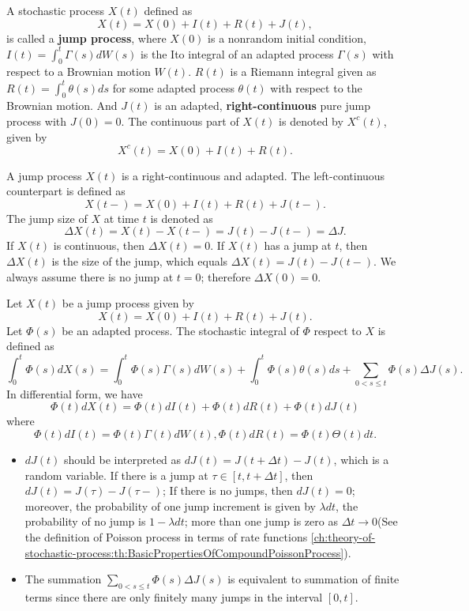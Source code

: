 \begin{refsection}
\begin{definition}\cite[475]{shreve2004stochastic2}
	A stochastic process $X(t)$ defined as
	$$X(t) = X(0) + I(t) + R(t) + J(t),$$
	is called a \textbf{jump process},
	where $X(0)$ is a nonrandom initial condition, $I(t) = \int_0^t \Gamma(s)dW(s)$ is the Ito integral of an adapted process $\Gamma(s)$ with respect to a Brownian motion $W(t)$. $R(t)$ is a Riemann integral given as
	$R(t) = \int_0^t \theta(s)ds$ for some adapted process $\theta(t)$ with respect to the Brownian motion.
	And $J(t)$  is an adapted, \textbf{right-continuous} pure jump process with $J(0) = 0$.
	The continuous part of $X(t)$ is denoted by $X^c(t)$, given by
	$$X^c(t) = X(0) + I(t) + R(t).$$
\end{definition}


\begin{remark}
	A jump process $X(t)$ is a right-continuous and adapted. The left-continuous counterpart is defined as
	$$X(t-) = X(0) + I(t)  + R(t) + J(t-).$$
	The jump size of $X$ at time $t$ is denoted as
	$$\Delta X(t) = X(t) - X(t-) = J(t) - J(t-) = \Delta J.$$
	If $X(t)$ is continuous, then $\Delta X(t) = 0$. If $X(t)$ has a jump at $t$, then $\Delta X(t)$ is the size of the jump, which equals $\Delta X(t)= J(t) - J(t-)$. 
	We always assume there is no jump at $t = 0$; therefore $\Delta X(0) = 0.$
\end{remark}

\begin{definition}\cite[475]{shreve2004stochastic2}
	Let $X(t)$ be a jump process given by
	$$X(t) = X(0) + I(t) + R(t) + J(t).$$
	Let $\Phi(s)$ be an adapted process. The stochastic integral of $\Phi$ respect to $X$ is defined as
	$$\int_0^t \Phi(s)dX(s) = \int_0^t \Phi(s)\Gamma(s)dW(s) + \int_0^t \Phi(s)\theta(s)ds + \sum_{0< s\leq t} \Phi(s)\Delta J(s).$$
	In differential form, we have
	$$\Phi(t)dX(t) = \Phi(t)dI(t) + \Phi(t)dR(t) + \Phi(t) dJ(t)$$
	where
	$$\Phi(t)dI(t) = \Phi(t)\Gamma(t)dW(t), \Phi(t)dR(t) = \Phi(t)\Theta(t)dt.$$
\end{definition}


\begin{remark}[interpretation]\hfill
	\begin{itemize}
		\item $dJ(t)$ should be interpreted as $dJ(t) = J(t+\Delta t) - J(t)$, which is a random variable. If there is a jump at $\tau\in [t,t+\Delta t]$, then $dJ(t) = J(\tau) - J(\tau-)$; If there is no jumps, then $dJ(t) = 0$; moreover, the probability of one jump increment is given by $\lambda d t$, the probability of no jump is $1- \lambda d t$; more than one jump is zero as $\Delta t\to 0$(See the definition of Poisson process in terms of rate functions \autoref{ch:theory-of-stochastic-process:th:BasicPropertiesOfCompoundPoissonProcess}).
		\item The summation $\sum_{0< s\leq t} \Phi(s)\Delta J(s)$ is equivalent to summation of finite terms since there are only finitely many jumps in the interval $[0,t]$. 
	\end{itemize}
\end{remark}





\end{refsection}

